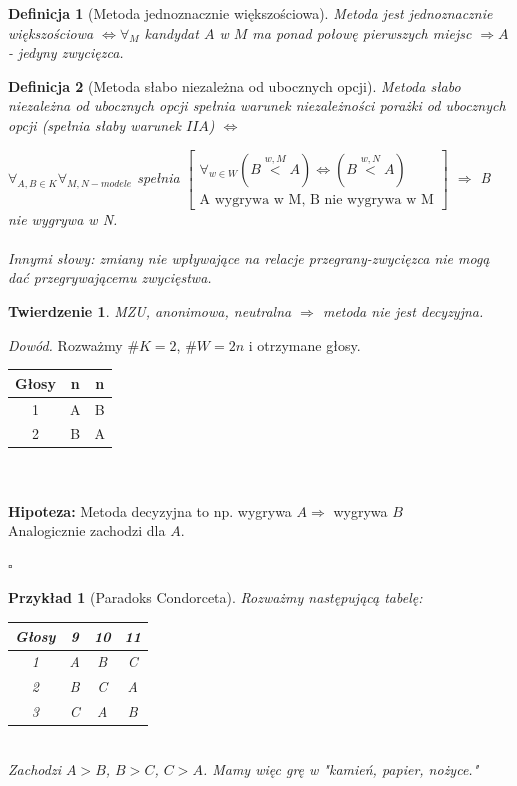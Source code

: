 \documentclass[12pt,a4paper]{article}
\theoremstyle{break}
\newtheorem{definition}{Definicja}[section]
\newtheorem{theorem}{Twierdzenie}[section]
\newtheorem{example}{Przykład}[section]
\newcommand{\witw}{$\Leftrightarrow$}
\begin{document}
		\begin{definition}[Metoda jednoznacznie większościowa]
			Metoda jest jednoznacznie większościowa \witw $\forall_M$ kandydat $A$ w $M$ ma ponad połowę pierwszych miejsc $\Rightarrow A$ - jedyny zwycięzca.
		\end{definition}
		
		\begin{definition}[Metoda słabo niezależna od ubocznych opcji]
			Metoda słabo niezależna od ubocznych opcji spełnia warunek niezależności porażki od ubocznych opcji (spełnia słaby warunek $IIA$) \witw
			
			$\forall_{A,B\in K} \forall_{M,N - modele}$ spełnia 
			$\begin{bmatrix}
				\forall_{w\in W} (B\overset{w,M}{<}A) \text{\witw} (B\overset{w,N}{<}A) \\
				\text{A wygrywa w M, B nie wygrywa w M}		 
			\end{bmatrix}$	$\Rightarrow$ B nie wygrywa w N.\\\\
			
			Innymi słowy: zmiany nie wpływające na relacje przegrany-zwycięzca nie mogą dać przegrywającemu zwycięstwa.		
			
		\end{definition}
		
		\begin{theorem}
			MZU, anonimowa, neutralna $\Rightarrow$ metoda nie jest decyzyjna.
		\end{theorem}
		\textit{Dowód.} Rozważmy $\# K = 2$, $\# W = 2n$ i otrzymane głosy.\\
		
		\begin{tabular}{|c|c|c|}\hline
			Głosy&n&n\\\hline
			1&A&B\\\hline
			2&B&A\\\hline
		\end{tabular}\\\\
		\textbf{Hipoteza:} Metoda decyzyjna to np. wygrywa $A \Rightarrow$ wygrywa $B$ \faBolt\\
		Analogicznie zachodzi dla $A$.
		
		\begin{flushright}$\square$\end{flushright}
		
		\begin{example}[Paradoks Condorceta]
			Rozważmy następującą tabelę:\\
			\begin{tabular}{|c|c|c|c|}\hline
				Głosy&9&10&11\\\hline
				1&A&B&C\\\hline
				2&B&C&A\\\hline
				3&C&A&B\\\hline
			\end{tabular}\\
			
			Zachodzi $A>B$, $B>C$, $C>A$. Mamy więc grę w "kamień, papier, nożyce."
		\end{example}
		
\end{document}

